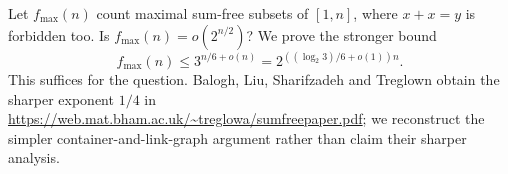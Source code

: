 Let $f_{\max}(n)$ count maximal sum-free subsets of $[1,n]$, where $x+x=y$ is forbidden too. Is $f_{\max}(n)=o(2^{n/2})$? We prove the stronger bound
\[
 f_{\max}(n)\le3^{n/6+o(n)}=2^{((\log_2 3)/6+o(1))n}.
\]
This suffices for the question. Balogh, Liu, Sharifzadeh and Treglown obtain the sharper exponent $1/4$ in \url{https://web.mat.bham.ac.uk/~treglowa/sumfreepaper.pdf}; we reconstruct the simpler container-and-link-graph argument rather than claim their sharper analysis.
